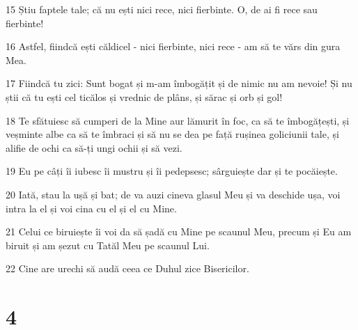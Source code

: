 \par 15 Știu faptele tale; că nu ești nici rece, nici fierbinte. O, de ai fi rece sau fierbinte!
\par 16 Astfel, fiindcă ești căldicel - nici fierbinte, nici rece - am să te vărs din gura Mea.
\par 17 Fiindcă tu zici: Sunt bogat și m-am îmbogățit și de nimic nu am nevoie! Și nu știi că tu ești cel ticălos și vrednic de plâns, și sărac și orb și gol!
\par 18 Te sfătuiesc să cumperi de la Mine aur lămurit în foc, ca să te îmbogățești, și veșminte albe ca să te îmbraci și să nu se dea pe față rușinea goliciunii tale, și alifie de ochi ca să-ți ungi ochii și să vezi.
\par 19 Eu pe câți îi iubesc îi mustru și îi pedepsesc; sârguiește dar și te pocăiește.
\par 20 Iată, stau la ușă și bat; de va auzi cineva glasul Meu și va deschide ușa, voi intra la el și voi cina cu el și el cu Mine.
\par 21 Celui ce biruiește îi voi da să șadă cu Mine pe scaunul Meu, precum și Eu am biruit și am șezut cu Tatăl Meu pe scaunul Lui.
\par 22 Cine are urechi să audă ceea ce Duhul zice Bisericilor.

\chapter{4}

